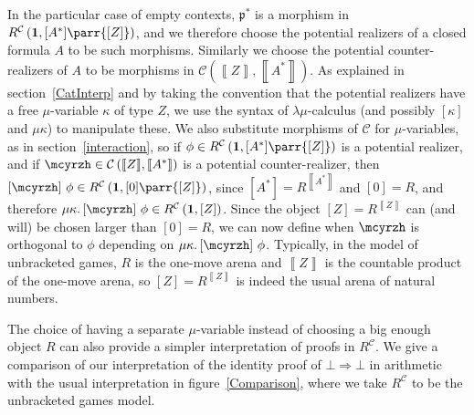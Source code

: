 \documentclass{CSML}
\newcommand*\LogImp{\mathbin{\Rightarrow}}
\newcommand*\LogBot\bot
\newcommand*\LogFormA{A}
\newcommand*\LogProofA{\mathfrak{p}}
\newcommand*\LmSortBot0
\newcommand*\LmSortExtract{Z}
\newcommand*\LmInterpForm[1]{{#1}^*}
\newcommand*\LmInterpProof[1]{{#1}^*}
\newcommand*\CatC{\mathcal{C}}
\newcommand*\CatR{R}
\newcommand*\CatRC{\CatExp{\CatR}{\CatC}}
\newcommand*\CatExp[2]{#1^{#2}}
\newcommand*\CatPar\parr
\newcommand*\CatRCHomA\phi
\newcommand*\CatCHomA\mcyrzh
\newcommand*\CatTerm{\mathbf{1}}
\newcommand*\CatInterpSortNeg[1]{{\left\llbracket#1\right\rrbracket}}
\newcommand*\CatInterpSort[1]{{\left[#1\right]}}
\begin{document}
In the particular case of empty contexts, $\LmInterpProof{\LogProofA}$ is a morphism in $\CatRC\left(\CatTerm,\CatInterpSort{\LmInterpForm{\LogFormA}}\CatPar\CatInterpSort{\LmSortExtract}\right)$, and we therefore choose the potential realizers of a closed formula $\LogFormA$ to be such morphisms. Similarly we choose the potential counter-realizers of $\LogFormA$ to be morphisms in $\CatC\left(\CatInterpSortNeg{\LmSortExtract},\CatInterpSortNeg{\LmInterpForm{\LogFormA}}\right)$. As explained in section~\ref{CatInterp} and by taking the convention that the potential realizers have a free $\mu$-variable $\kappa$ of type $\LmSortExtract$, we use the syntax of $\lambda\mu$-calculus (and possibly $\left[\kappa\right]$ and $\mu\kappa$) to manipulate these. We also substitute morphisms of $\CatC$ for $\mu$-variables, as in section~\ref{interaction}, so if $\CatRCHomA\in\CatRC\left(\CatTerm,\CatInterpSort{\LmInterpForm{\LogFormA}}\CatPar\CatInterpSort{\LmSortExtract}\right)$ is a potential realizer, and if $\CatCHomA\in\CatC\left(\CatInterpSortNeg{\LmSortExtract},\CatInterpSortNeg{\LmInterpForm{\LogFormA}}\right)$ is a potential counter-realizer, then $\left[\CatCHomA\right]\,\CatRCHomA\in\CatRC\left(\CatTerm,\CatInterpSort{\LmSortBot}\CatPar\CatInterpSort{\LmSortExtract}\right)$, since $\CatInterpSort{\LmInterpForm{\LogFormA}}=\CatExp{\CatR}{\CatInterpSortNeg{\LmInterpForm{\LogFormA}}}$ and $\CatInterpSort{\LmSortBot}=\CatR$, and therefore $\mu\kappa.\left[\CatCHomA\right]\,\CatRCHomA\in\CatRC\left(\CatTerm,\CatInterpSort{\LmSortExtract}\right)$. Since the object $\CatInterpSort{\LmSortExtract}=\CatExp{\CatR}{\CatInterpSortNeg{\LmSortExtract}}$ can (and will) be chosen larger than $\CatInterpSort{\LmSortBot}=\CatR$, we can now define when $\CatCHomA$ is orthogonal to $\CatRCHomA$ depending on $\mu\kappa.\left[\CatCHomA\right]\,\CatRCHomA$. Typically, in the model of unbracketed games, $\CatR$ is the one-move arena and $\CatInterpSortNeg{\LmSortExtract}$ is the countable product of the one-move arena, so $\CatInterpSort{\LmSortExtract}=\CatExp{\CatR}{\CatInterpSortNeg{\LmSortExtract}}$ is indeed the usual arena of natural numbers.\par
The choice of having a separate $\mu$-variable instead of choosing a big enough object $\CatR$ can also provide a simpler interpretation of proofs in $\CatRC$. We give a comparison of our interpretation of the identity proof of $\LogBot\LogImp\LogBot$ in arithmetic with the usual interpretation in figure~\ref{Comparison}, where we take $\CatRC$ to be the unbracketed games model.
\end{document}
